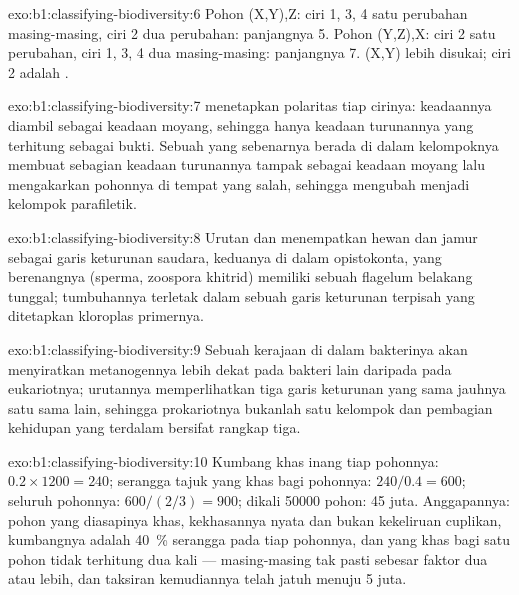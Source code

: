 \begin{solution}{exo:b1:classifying-biodiversity:6}
Pohon (X,Y),Z: ciri 1, 3, 4 satu perubahan masing-masing, ciri 2 dua
perubahan: panjangnya 5. Pohon (Y,Z),X: ciri 2 satu perubahan, ciri
1, 3, 4 dua masing-masing: panjangnya 7. (X,Y) lebih disukai; ciri 2
adalah .
\end{solution}

\begin{solution}{exo:b1:classifying-biodiversity:7}
 menetapkan polaritas tiap cirinya: keadaannya diambil
sebagai keadaan moyang, sehingga hanya keadaan turunannya yang
terhitung sebagai bukti. Sebuah  yang sebenarnya berada
di dalam kelompoknya membuat sebagian keadaan turunannya tampak
sebagai keadaan moyang lalu mengakarkan pohonnya di tempat yang salah,
sehingga mengubah  menjadi kelompok parafiletik.
\end{solution}

\begin{solution}{exo:b1:classifying-biodiversity:8}
Urutan  dan  menempatkan hewan dan jamur sebagai
garis keturunan saudara, keduanya di dalam opistokonta, yang 
berenangnya (sperma, zoospora khitrid) memiliki sebuah flagelum
belakang tunggal; tumbuhannya terletak dalam sebuah garis keturunan
terpisah yang ditetapkan kloroplas primernya.
\end{solution}

\begin{solution}{exo:b1:classifying-biodiversity:9}
Sebuah kerajaan di dalam bakterinya akan menyiratkan metanogennya lebih
dekat pada bakteri lain daripada pada eukariotnya; urutannya
memperlihatkan tiga garis keturunan yang sama jauhnya satu sama lain,
sehingga prokariotnya bukanlah satu kelompok dan pembagian kehidupan
yang terdalam bersifat rangkap tiga.
\end{solution}

\begin{solution}{exo:b1:classifying-biodiversity:10}
Kumbang khas inang tiap  pohonnya: $0.2\times 1200 = 240$;
serangga tajuk yang khas bagi pohonnya: $240/0.4 = 600$; seluruh
pohonnya: $600/(2/3) = 900$; dikali \num{50000} pohon: \num{45} juta.
Anggapannya: pohon yang diasapinya khas, kekhasannya nyata dan bukan
kekeliruan cuplikan, kumbangnya adalah \qty{40}{\%} serangga pada tiap
pohonnya, dan  yang khas bagi satu pohon tidak terhitung dua
kali --- masing-masing tak pasti sebesar faktor dua atau lebih, dan
taksiran kemudiannya telah jatuh menuju \num{5} juta.
\end{solution}

